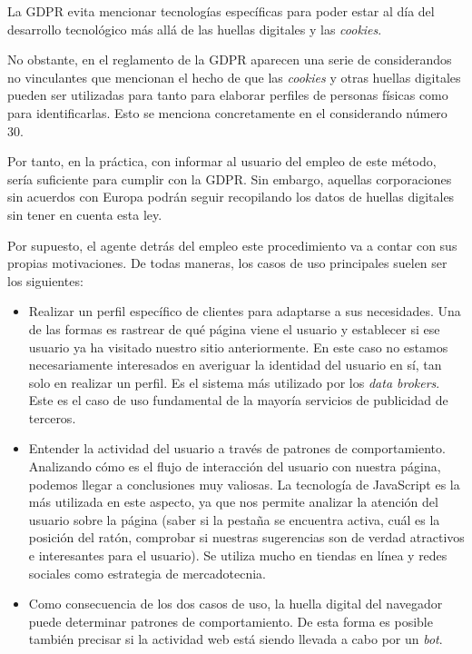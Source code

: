 La GDPR evita mencionar tecnologías específicas para poder estar al día del desarrollo tecnológico más allá de las huellas digitales y las \textit{cookies}\cite{gdpr_eff}. \par 

No obstante, en el reglamento de la GDPR aparecen una serie de considerandos no vinculantes que mencionan el hecho de que las \textit{cookies} y otras huellas digitales pueden ser utilizadas para tanto para elaborar perfiles de personas físicas como para identificarlas. Esto se menciona concretamente en el considerando número 30\cite{gdpr}. \par 

Por tanto, en la práctica, con informar al usuario del empleo de este método, sería suficiente para cumplir con la GDPR\cite{blokt}. Sin embargo, aquellas corporaciones sin acuerdos con Europa podrán seguir recopilando los datos de huellas digitales sin tener en cuenta esta ley. \par

Por supuesto, el agente detrás del empleo este procedimiento va a contar con sus propias motivaciones. De todas maneras, los casos de uso principales suelen ser los siguientes: \par

\begin{itemize}
	\item Realizar un perfil específico de clientes para adaptarse a sus necesidades. Una de las formas es rastrear de qué página viene el usuario y establecer si ese usuario ya ha visitado nuestro sitio anteriormente. En este caso no estamos necesariamente interesados en averiguar la identidad del usuario en sí, tan solo en realizar un perfil. Es el sistema más utilizado por los \textit{data brokers}\cite{data_brocker}. Este es el caso de uso fundamental de la mayoría servicios de publicidad de terceros. \par 
	
	\item Entender la actividad del usuario a través de patrones de comportamiento. Analizando cómo es el flujo de interacción del usuario con nuestra página, podemos llegar a conclusiones muy valiosas. La tecnología de JavaScript es la más utilizada en este aspecto, ya que nos permite analizar la atención del usuario sobre la página (saber si la pestaña se encuentra activa, cuál es la posición del ratón, comprobar si nuestras sugerencias son de verdad atractivos e interesantes para el usuario). Se utiliza mucho en tiendas en línea y redes sociales como estrategia de mercadotecnia. \par 
	
	\item Como consecuencia de los dos casos de uso, la huella digital del navegador puede determinar patrones de comportamiento. De esta forma es posible también precisar si la actividad web está siendo llevada a cabo por un \textit{bot}\cite{bot_paper}. \par 
\end{itemize}

